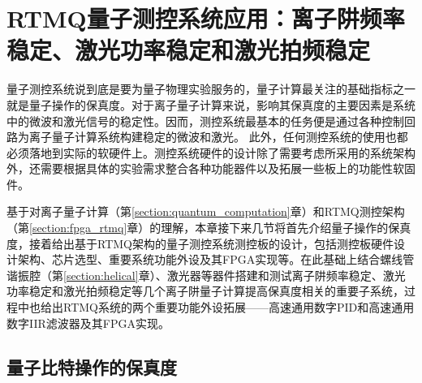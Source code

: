

\chapter[RTMQ测控系统应用：离子阱频率稳定、激光功率稳定和激光拍频稳定]{RTMQ量子测控系统应用：离子阱频率稳定、激光功率稳定和激光拍频稳定\label{section:implementation}}


量子测控系统说到底是要为量子物理实验服务的，量子计算最关注的基础指标之一就是量子操作的保真度。对于离子量子计算来说，影响其保真度的主要因素是系统中的微波和激光信号的稳定性。因而，测控系统最基本的任务便是通过各种控制回路为离子量子计算系统构建稳定的微波和激光。
此外，任何测控系统的使用也都必须落地到实际的软硬件上。测控系统硬件的设计除了需要考虑所采用的系统架构外，还需要根据具体的实验需求整合各种功能器件以及拓展一些板上的功能性软固件。

基于对离子量子计算（第\ref{section:quantum_computation}章）和RTMQ测控架构（第\ref{section:fpga_rtmq}章）的理解，本章接下来几节将首先介绍量子操作的保真度，接着给出基于RTMQ架构的量子测控系统测控板的设计，包括测控板硬件设计架构、芯片选型、重要系统功能外设及其FPGA实现等。在此基础上结合螺线管谐振腔（第\ref{section:helical}章）、激光器等器件搭建和测试离子阱频率稳定、激光功率稳定和激光拍频稳定等几个离子阱量子计算提高保真度相关的重要子系统，过程中也给出RTMQ系统的两个重要功能外设拓展——高速通用数字PID和高速通用数字IIR滤波器及其FPGA实现。






\section[量子比特操作的保真度]{量子比特操作的保真度}


